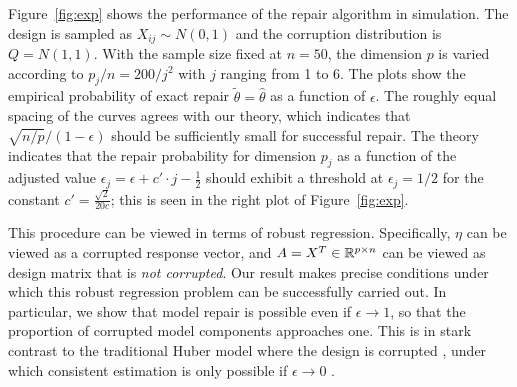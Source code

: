 Figure~\ref{fig:exp} shows the performance of
the repair algorithm in simulation. The design is sampled as $X_{ij} \sim N(0,1)$ and the corruption distribution is $Q = N(1,1)$. With the sample size fixed at $n=50$, the dimension $p$ is varied according to $p_j/n=200/j^2$ with
$j$ ranging from 1 to 6. The plots show the empirical probability of exact repair $\tilde\theta = \hat\theta$ as a function of $\epsilon$. The roughly equal spacing of the curves agrees with our theory, which indicates that $\sqrt{n/p}/(1-\epsilon)$ should be sufficiently small for successful repair. The theory indicates that the repair probability for dimension $p_j$ as a function of the adjusted value $\epsilon_j = \epsilon + c'\cdot j - \frac{1}{2}$ should exhibit a threshold at
$\epsilon_j = 1/2$ for the constant $c' = \frac{\sqrt{2}}{20 c}$; this is seen in the right plot of Figure~\ref{fig:exp}.



 This procedure can be viewed in terms of robust regression. Specifically, $\eta$ can be viewed as a corrupted response vector, and $A = X^T \in \mathbb{R}^{p\times n}$ can be viewed as design matrix that is \textit{not corrupted}.  Our result makes precise conditions under which this robust regression problem can be successfully carried out.
In particular, we show that model repair is possible even if $\epsilon \to 1$, so that the proportion of corrupted model components approaches one. This is in stark contrast to the traditional Huber model where the design is corrupted \citep{huber:64}, under which consistent estimation is only possible if $\epsilon \to 0$ \citep{chen2016,gao2020}.

